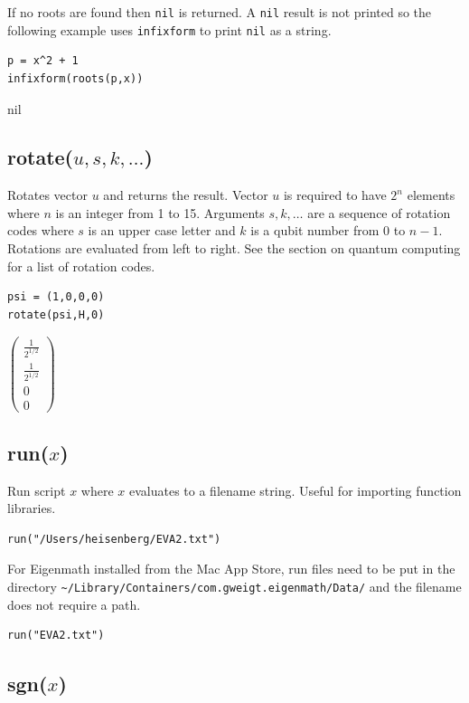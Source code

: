 \documentclass[12pt]{article}
\begin{document}
\bigskip
If no roots are found then \verb$nil$ is returned.
A \verb$nil$ result is not printed so the following example uses
\verb$infixform$ to print \verb$nil$ as a string.

{\color{blue}
\begin{verbatim}
p = x^2 + 1
infixform(roots(p,x))
\end{verbatim}
}

nil

\subsection*{rotate($u,s,k,\ldots$)}
Rotates vector $u$ and returns the result.
Vector $u$ is required to have $2^n$ elements where
$n$ is an integer from 1 to 15.
Arguments $s,k,\ldots$ are a sequence of rotation codes
where $s$ is an upper case letter and $k$ is a qubit number
from 0 to $n-1$.
Rotations are evaluated from left to right.
See the section on quantum computing for a list of rotation codes.

{\color{blue}
\begin{verbatim}
psi = (1,0,0,0)
rotate(psi,H,0)
\end{verbatim}
}

$
\begin{pmatrix}
\frac{1}{2^{1/2}}
\\[1ex]
\frac{1}{2^{1/2}}
\\[1ex]
0
\\[1ex]
0
\end{pmatrix}
$

\subsection*{run($x$)}

Run script $x$ where $x$ evaluates to a filename string.
Useful for importing function libraries.

{\color{blue}
\begin{verbatim}
run("/Users/heisenberg/EVA2.txt")
\end{verbatim}
}

For Eigenmath installed from the Mac App Store,
run files need to be put in the directory
\verb$~/Library/Containers/com.gweigt.eigenmath/Data/$
and the filename does not require a path.

{\color{blue}
\begin{verbatim}
run("EVA2.txt")
\end{verbatim}
}

\subsection*{sgn($x$)}
\end{document}
